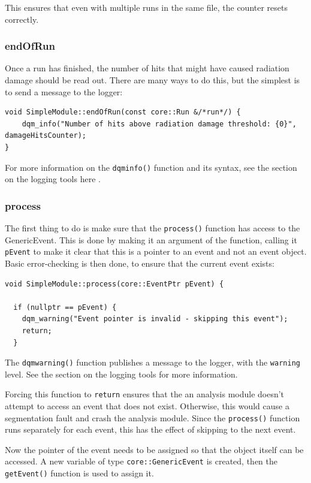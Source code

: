 This ensures that even with multiple runs in the same file, the counter resets correctly.

\subsubsection{endOfRun}
Once a run has finished, the number of hits that might have caused radiation damage should be read out. There are many ways to do this, but the simplest is to send a message to the logger:

\begin{lstlisting}
void SimpleModule::endOfRun(const core::Run &/*run*/) {
    dqm_info("Number of hits above radiation damage threshold: {0}", damageHitsCounter);
}
\end{lstlisting}

For more information on the \texttt{dqm\textunderscore info()} function and its syntax, see the section on the logging tools here \cite{dqm4hep-user-manual-coretools}.

\subsubsection{process}
The first thing to do is make sure that the \texttt{process()} function has access to the GenericEvent. This is done by making it an argument of the function, calling it \texttt{pEvent} to make it clear that this is a pointer to an event and not an event object. Basic error-checking is then done, to ensure that the current event exists:

\begin{lstlisting}
void SimpleModule::process(core::EventPtr pEvent) {

  if (nullptr == pEvent) {
    dqm_warning("Event pointer is invalid - skipping this event");
    return;
  }
\end{lstlisting}

The \texttt{dqm\textunderscore warning()} function publishes a message to the logger, with the \texttt{warning} level. See the section on the logging tools for more information.

Forcing this function to \texttt{return} ensures that the an analysis module doesn't attempt to access an event that does not exist. Otherwise, this would cause a segmentation fault and crash the analysis module. Since the \texttt{process()} function runs separately for each event, this has the effect of skipping to the next event.

Now the pointer of the event needs to be assigned so that the object itself can be accessed. A new variable of type \texttt{core::GenericEvent} is created, then the \texttt{getEvent()} function is used to assign it.


